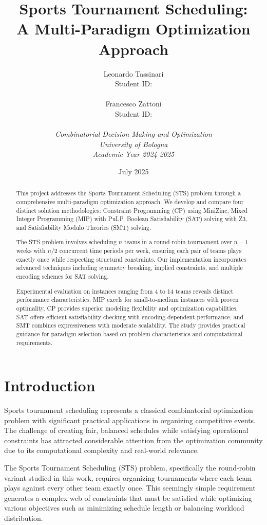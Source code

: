 \documentclass[11pt]{article}
\title{\textbf{Sports Tournament Scheduling: \\
A Multi-Paradigm Optimization Approach}}
\author{
Leonardo Tassinari \\
Student ID:   \\
\\
Francesco Zattoni \\
Student ID:   \\
\\
\textit{Combinatorial Decision Making and Optimization} \\
\textit{University of Bologna} \\
\textit{Academic Year 2024-2025}
}
\date{July 2025}
\begin{document}
\maketitle

\begin{abstract}
This project addresses the Sports Tournament Scheduling (STS) problem through a comprehensive multi-paradigm optimization approach. We develop and compare four distinct solution methodologies: Constraint Programming (CP) using MiniZinc, Mixed Integer Programming (MIP) with PuLP, Boolean Satisfiability (SAT) solving with Z3, and Satisfiability Modulo Theories (SMT) solving. 

The STS problem involves scheduling $n$ teams in a round-robin tournament over $n-1$ weeks with $n/2$ concurrent time periods per week, ensuring each pair of teams plays exactly once while respecting structural constraints. Our implementation incorporates advanced techniques including symmetry breaking, implied constraints, and multiple encoding schemes for SAT solving.

Experimental evaluation on instances ranging from 4 to 14 teams reveals distinct performance characteristics: MIP excels for small-to-medium instances with proven optimality, CP provides superior modeling flexibility and optimization capabilities, SAT offers efficient satisfiability checking with encoding-dependent performance, and SMT combines expressiveness with moderate scalability. The study provides practical guidance for paradigm selection based on problem characteristics and computational requirements.
\end{abstract}

\tableofcontents
\newpage

\section{Introduction}

Sports tournament scheduling represents a classical combinatorial optimization problem with significant practical applications in organizing competitive events. The challenge of creating fair, balanced schedules while satisfying operational constraints has attracted considerable attention from the optimization community due to its computational complexity and real-world relevance.

The Sports Tournament Scheduling (STS) problem, specifically the round-robin variant studied in this work, requires organizing tournaments where each team plays against every other team exactly once. This seemingly simple requirement generates a complex web of constraints that must be satisfied while optimizing various objectives such as minimizing schedule length or balancing workload distribution.
\end{document}
